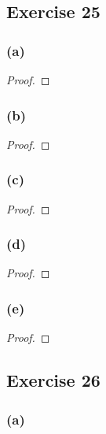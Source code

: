 \documentclass[14pt]{extarticle}
\begin{document}
\subsection{Exercise 25}

\subsubsection{(a)}

\begin{proof}

\end{proof}

\subsubsection{(b)}

\begin{proof}

\end{proof}

\subsubsection{(c)}

\begin{proof}

\end{proof}

\subsubsection{(d)}

\begin{proof}

\end{proof}

\subsubsection{(e)}

\begin{proof}

\end{proof}

\subsection{Exercise 26}

\subsubsection{(a)}
\end{document}

